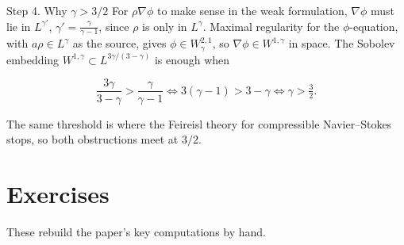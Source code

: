 \begin{step}{\routine{}Step 4. Why $\gamma > 3/2$}
For $\rho\nabla\phi$ to make sense in the weak formulation, $\nabla\phi$ must lie in $L^{\gamma'}$, $\gamma' = \frac{\gamma}{\gamma-1}$, since $\rho$ is only in $L^\gamma$. Maximal regularity for the $\phi$-equation, with $a\rho \in L^\gamma$ as the source, gives $\phi \in W^{2,1}_\gamma$, so $\nabla\phi \in W^{1,\gamma}$ in space. The Sobolev embedding $W^{1,\gamma} \subset L^{3\gamma/(3-\gamma)}$ is enough when

\[
      \frac{3\gamma}{3-\gamma} > \frac{\gamma}{\gamma-1} \iff 3(\gamma - 1) > 3 - \gamma \iff \gamma > \tfrac32 .
    \]

The same threshold is where the Feireisl theory for compressible Navier--Stokes stops, so both obstructions meet at $3/2$.

\end{step}

\section{Exercises}

These rebuild the paper's key computations by hand.

